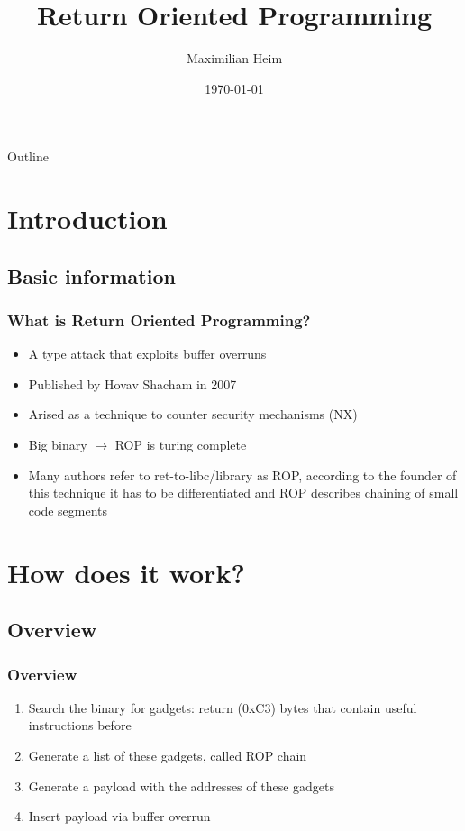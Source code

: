 \documentclass[11pt]{beamer}
\author{Maximilian Heim}
\title{Return Oriented Programming}
\institute{University Albstadt-Sigmaringen}
\date{\today}
\begin{document}
\begin{frame}
\titlepage
\end{frame}

\begin{frame}{Outline}
\tableofcontents
\end{frame}

\section{Introduction}
\subsection{Basic information}
\begin{frame}
    \frametitle{What is Return Oriented Programming?}
    \begin{itemize}
    \item A type attack that exploits buffer overruns
    \item Published by Hovav Shacham in 2007
    \item Arised as a technique to counter security mechanisms (NX)
    \item Big binary $\rightarrow$ ROP is turing complete
    \item Many authors refer to ret-to-libc/library as ROP, according to the founder of this technique it has to be differentiated and ROP describes chaining of small code segments
    \end{itemize}
\end{frame}

\section{How does it work?}
\subsection{Overview}
\begin{frame}
    \frametitle{Overview}
    \begin{enumerate}
        \item Search the binary for gadgets: return (0xC3) bytes that contain useful instructions before
        \item Generate a list of these gadgets, called ROP chain
        \item Generate a payload with the addresses of these gadgets
        \item Insert payload via buffer overrun
    \end{enumerate} 
\end{frame}
\end{document}
